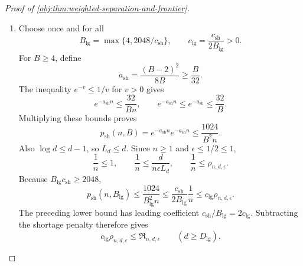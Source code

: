 \begin{proof}[Proof of \cref{obj:thm:weighted-separation-and-frontier}]
\begin{enumerate}
\item
Choose once and for all
\[
B_{\mathrm{lg}}=\max\{4,2048/c_{\mathrm{sh}}\},
\qquad
c_{\mathrm{lg}}=\frac{c_{\mathrm{sh}}}{2B_{\mathrm{lg}}}>0.
\]
For \(B\ge4\), define
\[
a_{\mathrm{sh}}=\frac{(B-2)^2}{8B}\ge\frac B{32}.
\]
The inequality \(e^{-v}\le1/v\) for \(v>0\) gives
\[
e^{-a_{\mathrm{sh}}n}\le\frac{32}{Bn},
\qquad
e^{-a_{\mathrm{sh}}n}\le e^{-a_{\mathrm{sh}}}\le\frac{32}{B}.
\]
Multiplying these bounds proves
\[
p_{\mathrm{sh}}(n,B)
=e^{-a_{\mathrm{sh}}n}e^{-a_{\mathrm{sh}}n}
\le\frac{1024}{B^2n}.
\]
Also \(\log d\le d-1\), so \(L_d\le d\). Since \(n\ge1\) and
\(\epsilon\le1/2\le1\),
\[
\frac1n\le1,
\qquad
\frac1n\le\frac d{n\epsilon L_d},
\qquad
\frac1n\le\rho_{n,d,\epsilon}.
\]
Because \(B_{\mathrm{lg}}c_{\mathrm{sh}}\ge2048\),
\[
p_{\mathrm{sh}}(n,B_{\mathrm{lg}})
\le\frac{1024}{B_{\mathrm{lg}}^2n}
\le\frac{c_{\mathrm{sh}}}{2B_{\mathrm{lg}}}\frac1n
\le c_{\mathrm{lg}}\rho_{n,d,\epsilon}.
\]
The preceding lower bound has leading coefficient
\(c_{\mathrm{sh}}/B_{\mathrm{lg}}=2c_{\mathrm{lg}}\). Subtracting the shortage penalty therefore gives
\[
c_{\mathrm{lg}}\rho_{n,d,\epsilon}
\le\mathfrak R_{n,d,\epsilon}
\qquad(d\ge D_{\mathrm{lg}}).
\]


\end{enumerate}
\end{proof}
